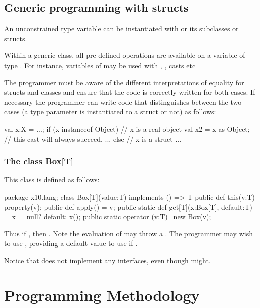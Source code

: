   
\subsection{Generic programming with structs}

An unconstrained type variable  can be instantiated with  or
its subclasses or structs.

Within a generic class, all pre-defined operations
are available on a variable of type
. For instance, variables of  may be used with \Xcd{==, !=},
, casts etc

The programmer must be aware of the different interpretations of
equality for structs and classes and ensure that the code is correctly
written for both cases. If necessary the programmer can write code
that distinguishes between the two cases (a type parameter  is
instantiated to a struct or not) as follows:


\begin{x10}
val x:X = ...;
if (x instanceof Object) { // x is a real object
   val x2 = x as Object; // this cast will always succeed.
   ...
} else { // x is a struct
   ...
}
\end{x10}
 
  
\subsubsection{The class Box[T]}

  This class is defined as follows: 

\begin{x10}
package x10.lang;
class Box[T](value:T) implements () => T {
   public def this(v:T) { property(v);}
   public def apply() = v;
   public static def get[T](x:Box[T], default:T) = x==null? default: x();
   public static operator (v:T)=new Box(v);
}
\end{x10}


Thus if , then . Note the evaluation of  may
throw a . The programmer may wish to use
, providing a default value to use if .

 Notice that  does not implement any interfaces, even
 though  might.
  
\section{Programming Methodology}

